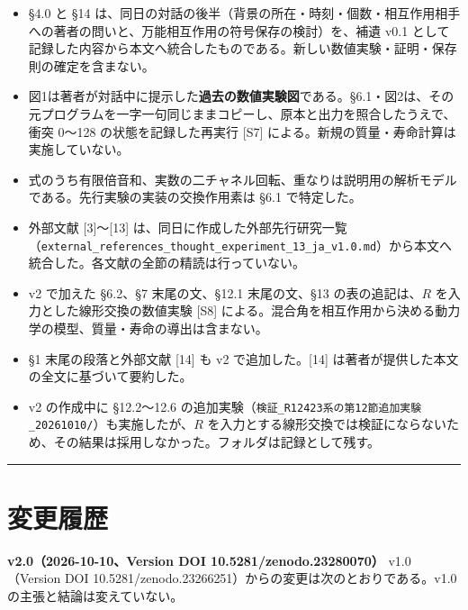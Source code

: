 \documentclass[
  a4paper,
]{ltjsarticle}
\providecommand{\tightlist}{%
  \setlength{\itemsep}{0pt}\setlength{\parskip}{0pt}}
\begin{document}
\begin{itemize}
\tightlist
\item
  §4.0 と §14
  は、同日の対話の後半（背景の所在・時刻・個数・相互作用相手への著者の問いと、万能相互作用の符号保存の検討）を、補遺
  v0.1
  として記録した内容から本文へ統合したものである。新しい数値実験・証明・保存則の確定を含まない。
\item
  図1は著者が対話中に提示した\textbf{過去の数値実験図}である。§6.1・図2は、その元プログラムを一字一句同じままコピーし、原本と出力を照合したうえで、衝突
  0〜128 の状態を記録した再実行 {[}S7{]}
  による。新規の質量・寿命計算は実施していない。
\item
  式のうち有限倍音和、実数の二チャネル回転、重なりは説明用の解析モデルである。先行実験の実装の交換作用素は
  §6.1 で特定した。
\item
  外部文献 {[}3{]}〜{[}13{]}
  は、同日に作成した外部先行研究一覧（\texttt{external\_\allowbreak{}references\_\allowbreak{}thought\_\allowbreak{}experiment\_\allowbreak{}13\_\allowbreak{}ja\_\allowbreak{}v1.0.md}）から本文へ統合した。各文献の全節の精読は行っていない。
\item
  v2 で加えた §6.2、§7 末尾の文、§12.1 末尾の文、§13 の表の追記は、\(R\)
  を入力とした線形交換の数値実験 {[}S8{]}
  による。混合角を相互作用から決める動力学の模型、質量・寿命の導出は含まない。
\item
  §1 末尾の段落と外部文献 {[}14{]} も v2 で追加した。{[}14{]}
  は著者が提供した本文の全文に基づいて要約した。
\item
  v2 の作成中に §12.2〜12.6
  の追加実験（\texttt{検証\_\allowbreak{}R12423系の第12節追加実験\_\allowbreak{}20261010/\allowbreak{}}）も実施したが、\(R\)
  を入力とする線形交換では検証にならないため、その結果は採用しなかった。フォルダは記録として残す。
\end{itemize}

\begin{center}\rule{0.5\linewidth}{0.5pt}\end{center}

\section{変更履歴}\label{ux5909ux66f4ux5c65ux6b74}

\textbf{v2.0（2026-10-10、Version DOI 10.5281/zenodo.23280070）}
v1.0（Version DOI
10.5281/zenodo.23266251）からの変更は次のとおりである。v1.0
の主張と結論は変えていない。
\end{document}
